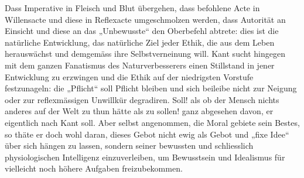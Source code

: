 Dass Imperative in Fleisch und Blut übergehen, dass befohlene Acte in Willensacte und diese in Reflexacte umgeschmolzen werden, dass Autorität an Einsicht und diese an das „Unbewusste“ den Oberbefehl abtrete: dies ist die natürliche Entwicklung, das natürliche Ziel jeder Ethik, die aus dem Leben herauswächst und demgemäss ihre Selbstverneinung will. Kant sucht hingegen mit dem ganzen Fanatismus des Naturverbesserers einen Stillstand in jener Entwicklung zu erzwingen und die Ethik auf der niedrigsten Vorstufe festzunageln: die „Pflicht“ soll Pflicht bleiben und sich beileibe nicht zur Neigung oder zur reflexmässigen Unwillkür degradiren. Soll! als ob der Mensch nichts anderes auf der Welt zu thun hätte als zu sollen! ganz abgesehen davon, er eigentlich nach Kant soll. Aber selbst angenommen, die Moral gebiete sein Bestes, so thäte er doch wohl daran, dieses Gebot nicht ewig als Gebot und „fixe Idee“ über sich hängen zu lassen, sondern seiner bewussten und schliesslich physiologischen Intelligenz einzuverleiben, um Bewusstsein und Idealismus für vielleicht noch höhere Aufgaben freizubekommen.
\par

